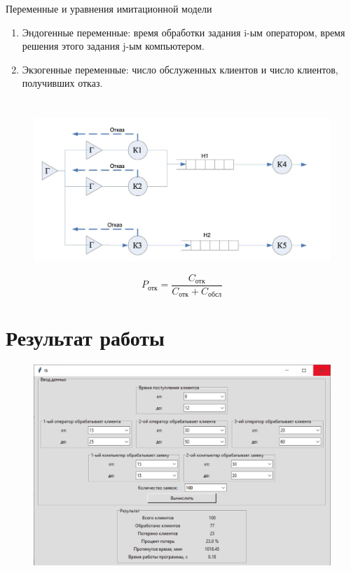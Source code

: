 \documentclass[12pt,a4paper,oneside]{report}
\begin{document}
\quad Переменные и уравнения имитационной модели 
\begin{enumerate} 
  \item Эндогенные переменные: время обработки задания i-ым оператором, время решения этого задания j-ым компьютером.
  \item Экзогенные переменные: число обслуженных клиентов и число клиентов, получивших отказ.
\end{enumerate}

\newpage
\section*{}
\begin{figure}[!h]
	\centering
	\includegraphics[scale=0.5]{teor_2.jpg}
	\label{fig:screenshot002}
\end{figure}

\begin{equation}
    P_{\text{отк}} = \frac{C_{\text{отк}}}{C_{\text{отк}} + C_{\text{обсл}}}  
\end{equation}


\newpage
\section*{Результат работы}
\begin{figure}[!h]
	\centering
	\includegraphics[scale=0.7]{1.png}
	\label{fig:screenshot003}
\end{figure}
\end{document}
